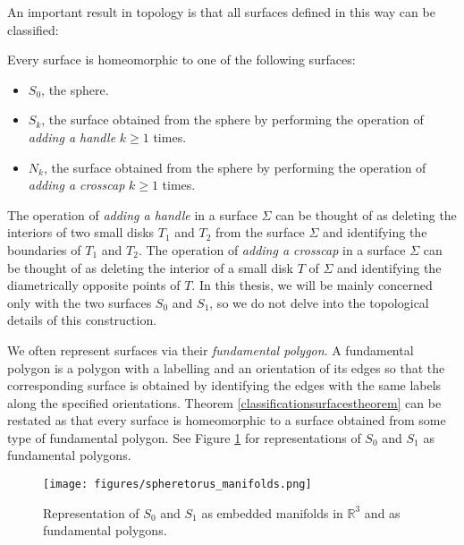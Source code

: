 An important result in topology is that all surfaces defined in this way can be classified:

\begin{theorem}
\label{classificationsurfacestheorem}
Every surface is homeomorphic to one of the following surfaces:

\begin{itemize}
	\item $S_0$, the sphere.
	\item $S_k$, the surface obtained from the sphere by performing the operation
	of \emph{adding a handle}  $k \geq 1$ times.
	\item $N_k$, the surface obtained from the sphere by performing the operation
	of \emph{adding a crosscap} $k \geq 1$ times.
\end{itemize}
\end{theorem}

The operation of \emph{adding a handle} in a surface $\Sigma$ can be thought of as deleting the 
interiors of two small  disks $T_1$ and $T_2$ from the surface $\Sigma$ and identifying
the boundaries of $T_1$ and $T_2$.
The operation of \emph{adding a crosscap} in a surface $\Sigma$ can be thought of as deleting the 
interior of a small disk $T$ of $\Sigma$ and identifying the diametrically opposite points of $T$.
In this thesis, we will be mainly concerned only with the two surfaces $S_0$ and $S_1$, so we 
do not delve into the topological details of this construction.

We often represent surfaces via their \emph{fundamental polygon}. A fundamental polygon is a 
polygon with a labelling and an orientation of its edges so that the corresponding surface is
obtained by identifying the edges with the same labels
along the specified orientations. Theorem \ref{classificationsurfacestheorem} can be restated
as that every surface is homeomorphic to a surface obtained from some type of fundamental
polygon. See Figure \ref{fig:spheretorusrepresentation} for representations of $S_0$ and $S_1$ as
fundamental polygons. 

\begin{figure}
\centering
\texttt{[image: figures/spheretorus\_manifolds.png]}
\begin{tikzpicture}

\end{tikzpicture}
\caption{Representation of $S_0$ and $S_1$ as embedded manifolds in $\mathbb{R}^3$ and as fundamental polygons.}
\label{fig:spheretorusrepresentation}
\end{figure}

